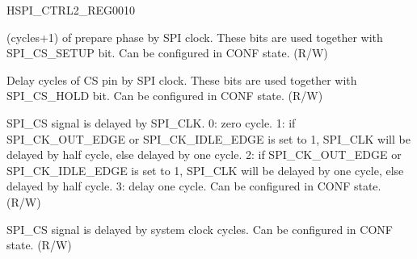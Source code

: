 \begin{register}{H}{SPI\_CTRL2\_REG}{\hexprefix{}0010}\label{regdesc:SPICTRL2REG}
%
%
%
%
%
\regnewline%
\begin{regdesc}\begin{reglist}
\label{fielddesc:SPICSSETUPTIME}\item [SPI\_CS\_SETUP\_TIME] (cycles+1) of prepare phase by SPI clock. These bits are used together with SPI\_CS\_SETUP bit. Can be configured in CONF state. (R/W)
\label{fielddesc:SPICSHOLDTIME}\item [SPI\_CS\_HOLD\_TIME] Delay cycles of CS pin by SPI clock. These bits are used together with SPI\_CS\_HOLD bit. Can be configured in CONF state. (R/W)
\label{fielddesc:SPICSDELAYMODE}\item [SPI\_CS\_DELAY\_MODE] SPI\_CS signal is delayed by SPI\_CLK. 0: zero cycle. 1: if SPI\_CK\_OUT\_EDGE or SPI\_CK\_IDLE\_EDGE is set to 1, SPI\_CLK will be delayed by half cycle, else delayed by one cycle. 2: if SPI\_CK\_OUT\_EDGE or SPI\_CK\_IDLE\_EDGE is set to 1, SPI\_CLK will be delayed by one cycle, else delayed by half cycle. 3: delay one cycle. Can be configured in CONF state. (R/W)
\label{fielddesc:SPICSDELAYNUM}\item [SPI\_CS\_DELAY\_NUM] SPI\_CS signal is delayed by system clock cycles. Can be configured in CONF state. (R/W)
\end{reglist}\end{regdesc}
\end{register}



